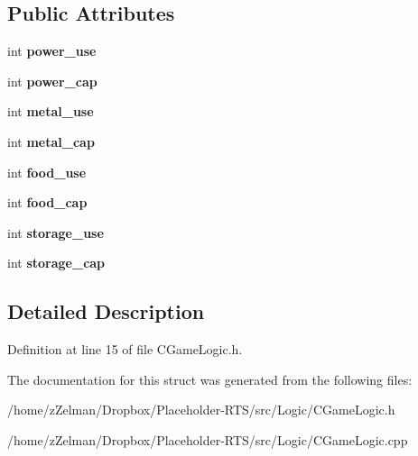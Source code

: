 \subsection*{Public Attributes}
\begin{DoxyCompactItemize}
\item 
\hypertarget{structSResources_a962feb3287c6b43bb69f62bd17356974}{int {\bfseries power\-\_\-use}}\label{structSResources_a962feb3287c6b43bb69f62bd17356974}

\item 
\hypertarget{structSResources_ac4013018e3f12f92b6b7eb592102613c}{int {\bfseries power\-\_\-cap}}\label{structSResources_ac4013018e3f12f92b6b7eb592102613c}

\item 
\hypertarget{structSResources_a5831244a71c80419557359b1a60912fd}{int {\bfseries metal\-\_\-use}}\label{structSResources_a5831244a71c80419557359b1a60912fd}

\item 
\hypertarget{structSResources_ad777ad7f6e4200a80b45a2756f2a1d07}{int {\bfseries metal\-\_\-cap}}\label{structSResources_ad777ad7f6e4200a80b45a2756f2a1d07}

\item 
\hypertarget{structSResources_ac38e896608f2b9387aaf9ee0fdbbcf09}{int {\bfseries food\-\_\-use}}\label{structSResources_ac38e896608f2b9387aaf9ee0fdbbcf09}

\item 
\hypertarget{structSResources_a87c057e7386cde8f3494279f6dcd25e4}{int {\bfseries food\-\_\-cap}}\label{structSResources_a87c057e7386cde8f3494279f6dcd25e4}

\item 
\hypertarget{structSResources_a277435cc33806e2962f0fc432e6de94e}{int {\bfseries storage\-\_\-use}}\label{structSResources_a277435cc33806e2962f0fc432e6de94e}

\item 
\hypertarget{structSResources_a106ffda02e0f2f100886121ba6904c36}{int {\bfseries storage\-\_\-cap}}\label{structSResources_a106ffda02e0f2f100886121ba6904c36}

\end{DoxyCompactItemize}


\subsection{Detailed Description}


Definition at line 15 of file C\-Game\-Logic.\-h.



The documentation for this struct was generated from the following files\-:\begin{DoxyCompactItemize}
\item 
/home/z\-Zelman/\-Dropbox/\-Placeholder-\/\-R\-T\-S/src/\-Logic/C\-Game\-Logic.\-h\item 
/home/z\-Zelman/\-Dropbox/\-Placeholder-\/\-R\-T\-S/src/\-Logic/C\-Game\-Logic.\-cpp\end{DoxyCompactItemize}
